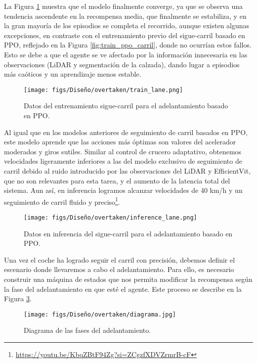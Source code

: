 La Figura \ref{fig:train_lane_overtaken} muestra que el modelo finalmente converge, ya que 
se observa una tendencia ascendente en la recompensa media, que finalmente se estabiliza, y
en la gran mayoría de los episodios se completa el recorrido, aunque existen algunas excepciones, en contraste con el entrenamiento previo del sigue-carril basado en \ac{PPO}, reflejado en la Figura \ref{fig:train_ppo_carril}, donde no ocurrían estos fallos. Esto se debe a que el agente se ve afectado por la información innecesaria en las observaciones (\ac{LiDAR} y segmentación de la calzada), dando lugar a episodios más caóticos y un aprendizaje menos estable.

\begin{figure}[ht]
\centering
\texttt{[image: figs/Diseño/overtaken/train\_lane.png]}
\caption{Datos del entrenamiento sigue-carril para el adelantamiento basado en \ac{PPO}.}
\label{fig:train_lane_overtaken}
\end{figure}

Al igual que en los modelos anteriores de seguimiento de carril basados en \ac{PPO}, este modelo aprende que las acciones más óptimas son valores del acelerador moderados y giros sutiles. Similar al control de crucero adaptativo, obtenemos velocidades ligeramente inferiores a las del modelo exclusivo de seguimiento de carril debido al ruido introducido por las observaciones del \ac{LiDAR} y EfficientVit, que no son relevantes para esta tarea, y el aumento de la latencia total del sistema. Aun así, en inferencia logramos alcanzar velocidades de 40 km/h y un seguimiento de carril fluido y preciso\footnote{\url{https://youtu.be/KbqZBtF94Zg?si=ZCgzfXDVZrmrB-cF}}.
\begin{figure}[ht]
\centering
\texttt{[image: figs/Diseño/overtaken/inference\_lane.png]}
\caption{Datos en inferencia del sigue-carril para el adelantamiento basado en \ac{PPO}.}
\label{fig:inference_lane_overtaken}
\end{figure}

Una vez el coche ha logrado seguir el carril con precisión, debemos definir el escenario donde llevaremos a cabo el adelantamiento. Para ello, es necesario construir una máquina de estados que nos permita modificar la recompensa según la fase del adelantamiento en que esté el agente. Este proceso se describe en la Figura \ref{fig:dim _overtaken}.
\begin{figure}[ht]
\centering
\texttt{[image: figs/Diseño/overtaken/diagrama.jpg]}
\caption{Diagrama de las fases del adelantamiento.}
\label{fig:dim _overtaken}
\end{figure}

